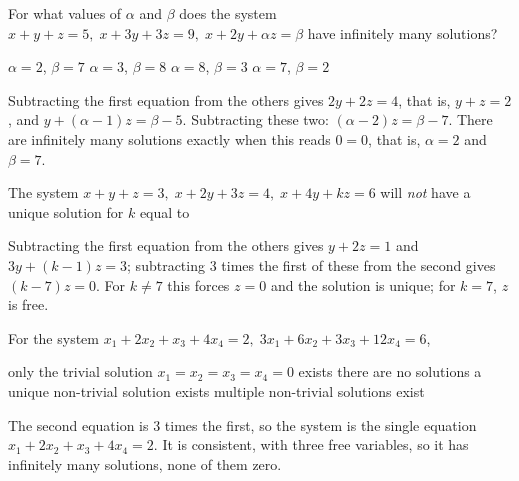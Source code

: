 \begin{question}[id=gate-ce2007-2, source=GATE CE 2007, marks=2]
For what values of $\alpha$ and $\beta$ does the system $x + y + z = 5,\; x + 3y + 3z = 9,\; x + 2y + \alpha z = \beta$ have infinitely many solutions?
\begin{options}
  \correct $\alpha = 2$, $\beta = 7$
  \option $\alpha = 3$, $\beta = 8$
  \option $\alpha = 8$, $\beta = 3$
  \option $\alpha = 7$, $\beta = 2$
\end{options}
\begin{solution}
Subtracting the first equation from the others gives $2y + 2z = 4$, that is, $y + z = 2$, and $y + (\alpha - 1)z = \beta - 5$. Subtracting these two: $(\alpha - 2)z = \beta - 7$. There are infinitely many solutions exactly when this reads $0 = 0$, that is, $\alpha = 2$ and $\beta = 7$.
\end{solution}
\end{question}

\begin{question}[id=gate-ce2008-2, source=GATE CE 2008]
The system $x + y + z = 3,\; x + 2y + 3z = 4,\; x + 4y + kz = 6$ will \emph{not} have a unique solution for $k$ equal to
\begin{options}
\end{options}
\begin{solution}
Subtracting the first equation from the others gives $y + 2z = 1$ and $3y + (k - 1)z = 3$; subtracting 3 times the first of these from the second gives $(k - 7)z = 0$. For $k \ne 7$ this forces $z = 0$ and the solution is unique; for $k = 7$, $z$ is free.
\end{solution}
\end{question}

\begin{question}[id=gate-ee2010-1, source=GATE EE 2010]
For the system $x_1 + 2x_2 + x_3 + 4x_4 = 2,\; 3x_1 + 6x_2 + 3x_3 + 12x_4 = 6$,
\begin{options}
  \option only the trivial solution $x_1 = x_2 = x_3 = x_4 = 0$ exists
  \option there are no solutions
  \option a unique non-trivial solution exists
  \correct multiple non-trivial solutions exist
\end{options}
\begin{solution}
The second equation is 3 times the first, so the system is the single equation $x_1 + 2x_2 + x_3 + 4x_4 = 2$. It is consistent, with three free variables, so it has infinitely many solutions, none of them zero.
\end{solution}
\end{question}

